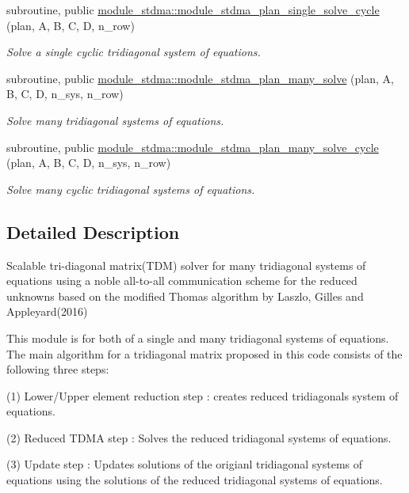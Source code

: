 \begin{DoxyCompactItemize}
subroutine, public \mbox{\hyperlink{namespacemodule__stdma_ae0554602dc9cb19da09c0555f12e1312}{module\+\_\+stdma\+::module\+\_\+stdma\+\_\+plan\+\_\+single\+\_\+solve\+\_\+cycle}} (plan, A, B, C, D, n\+\_\+row)
\begin{DoxyCompactList}\small\item\em Solve a single cyclic tridiagonal system of equations. \end{DoxyCompactList}\item 
subroutine, public \mbox{\hyperlink{namespacemodule__stdma_aa0817e49b29e14abc90f0aab91c4c2d9}{module\+\_\+stdma\+::module\+\_\+stdma\+\_\+plan\+\_\+many\+\_\+solve}} (plan, A, B, C, D, n\+\_\+sys, n\+\_\+row)
\begin{DoxyCompactList}\small\item\em Solve many tridiagonal systems of equations. \end{DoxyCompactList}\item 
subroutine, public \mbox{\hyperlink{namespacemodule__stdma_ab9a4a74a41d0b04823b5ac26f58a9733}{module\+\_\+stdma\+::module\+\_\+stdma\+\_\+plan\+\_\+many\+\_\+solve\+\_\+cycle}} (plan, A, B, C, D, n\+\_\+sys, n\+\_\+row)
\begin{DoxyCompactList}\small\item\em Solve many cyclic tridiagonal systems of equations. \end{DoxyCompactList}\end{DoxyCompactItemize}


\subsection{Detailed Description}
Scalable tri-\/diagonal matrix(\+T\+D\+M) solver for many tridiagonal systems of equations using a noble all-\/to-\/all communication scheme for the reduced unknowns based on the modified Thomas algorithm by Laszlo, Gilles and Appleyard(2016) 

This module is for both of a single and many tridiagonal systems of equations. The main algorithm for a tridiagonal matrix proposed in this code consists of the following three steps\+:
\begin{DoxyItemize}
\item (1) Lower/\+Upper element reduction step \+: creates reduced tridiagonals system of equations.
\item (2) Reduced T\+D\+MA step \+: Solves the reduced tridiagonal systems of equations.
\item (3) Update step \+: Updates solutions of the origianl tridiagonal systems of equations using the solutions of the reduced tridiagonal systems of equations.
\end{DoxyItemize}

